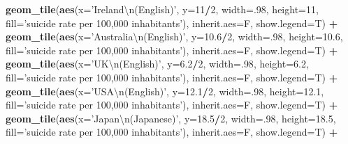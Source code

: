 \documentclass[]{article}
\newenvironment{Shaded}{\begin{snugshade}}{\end{snugshade}}
\newcommand{\CharTok}[1]{\textcolor[rgb]{0.31,0.60,0.02}{#1}}
\newcommand{\DataTypeTok}[1]{\textcolor[rgb]{0.13,0.29,0.53}{#1}}
\newcommand{\DecValTok}[1]{\textcolor[rgb]{0.00,0.00,0.81}{#1}}
\newcommand{\FloatTok}[1]{\textcolor[rgb]{0.00,0.00,0.81}{#1}}
\newcommand{\KeywordTok}[1]{\textcolor[rgb]{0.13,0.29,0.53}{\textbf{#1}}}
\newcommand{\NormalTok}[1]{#1}
\newcommand{\OperatorTok}[1]{\textcolor[rgb]{0.81,0.36,0.00}{\textbf{#1}}}
\newcommand{\StringTok}[1]{\textcolor[rgb]{0.31,0.60,0.02}{#1}}
\begin{document}
\begin{Shaded}
\begin{Highlighting}[]
{{{{{{{{{{{{{{{{{{{{{{{{\StringTok{    }\KeywordTok{geom_tile}\NormalTok{(}\KeywordTok{aes}\NormalTok{(}\DataTypeTok{x=}\StringTok{'Ireland}\CharTok{\textbackslash{}n}\StringTok{(English)'}\NormalTok{,    }\DataTypeTok{y=}\DecValTok{11}\OperatorTok{/}\DecValTok{2}\NormalTok{,   }\DataTypeTok{width=}\NormalTok{.}\DecValTok{98}\NormalTok{, }\DataTypeTok{height=}\DecValTok{11}\NormalTok{, }\DataTypeTok{fill=}\StringTok{'suicide rate per 100,000 inhabitants'}\NormalTok{), }\DataTypeTok{inherit.aes=}\NormalTok{F, }\DataTypeTok{show.legend=}\NormalTok{T) }\OperatorTok{+}
\StringTok{    }\KeywordTok{geom_tile}\NormalTok{(}\KeywordTok{aes}\NormalTok{(}\DataTypeTok{x=}\StringTok{'Australia}\CharTok{\textbackslash{}n}\StringTok{(English)'}\NormalTok{,  }\DataTypeTok{y=}\FloatTok{10.6}\OperatorTok{/}\DecValTok{2}\NormalTok{, }\DataTypeTok{width=}\NormalTok{.}\DecValTok{98}\NormalTok{, }\DataTypeTok{height=}\FloatTok{10.6}\NormalTok{, }\DataTypeTok{fill=}\StringTok{'suicide rate per 100,000 inhabitants'}\NormalTok{), }\DataTypeTok{inherit.aes=}\NormalTok{F, }\DataTypeTok{show.legend=}\NormalTok{T) }\OperatorTok{+}
\StringTok{    }\KeywordTok{geom_tile}\NormalTok{(}\KeywordTok{aes}\NormalTok{(}\DataTypeTok{x=}\StringTok{'UK}\CharTok{\textbackslash{}n}\StringTok{(English)'}\NormalTok{,         }\DataTypeTok{y=}\FloatTok{6.2}\OperatorTok{/}\DecValTok{2}\NormalTok{,  }\DataTypeTok{width=}\NormalTok{.}\DecValTok{98}\NormalTok{, }\DataTypeTok{height=}\FloatTok{6.2}\NormalTok{, }\DataTypeTok{fill=}\StringTok{'suicide rate per 100,000 inhabitants'}\NormalTok{), }\DataTypeTok{inherit.aes=}\NormalTok{F, }\DataTypeTok{show.legend=}\NormalTok{T) }\OperatorTok{+}
\StringTok{    }\KeywordTok{geom_tile}\NormalTok{(}\KeywordTok{aes}\NormalTok{(}\DataTypeTok{x=}\StringTok{'USA}\CharTok{\textbackslash{}n}\StringTok{(English)'}\NormalTok{,        }\DataTypeTok{y=}\FloatTok{12.1}\OperatorTok{/}\DecValTok{2}\NormalTok{, }\DataTypeTok{width=}\NormalTok{.}\DecValTok{98}\NormalTok{, }\DataTypeTok{height=}\FloatTok{12.1}\NormalTok{, }\DataTypeTok{fill=}\StringTok{'suicide rate per 100,000 inhabitants'}\NormalTok{), }\DataTypeTok{inherit.aes=}\NormalTok{F, }\DataTypeTok{show.legend=}\NormalTok{T) }\OperatorTok{+}
\StringTok{    }\KeywordTok{geom_tile}\NormalTok{(}\KeywordTok{aes}\NormalTok{(}\DataTypeTok{x=}\StringTok{'Japan}\CharTok{\textbackslash{}n}\StringTok{(Japanese)'}\NormalTok{,     }\DataTypeTok{y=}\FloatTok{18.5}\OperatorTok{/}\DecValTok{2}\NormalTok{, }\DataTypeTok{width=}\NormalTok{.}\DecValTok{98}\NormalTok{, }\DataTypeTok{height=}\FloatTok{18.5}\NormalTok{, }\DataTypeTok{fill=}\StringTok{'suicide rate per 100,000 inhabitants'}\NormalTok{), }\DataTypeTok{inherit.aes=}\NormalTok{F, }\DataTypeTok{show.legend=}\NormalTok{T) }\OperatorTok{+}
}}}}}}}}}}}}}}}}}}}}}}}}
\end{Highlighting}
\end{Shaded}
\end{document}
